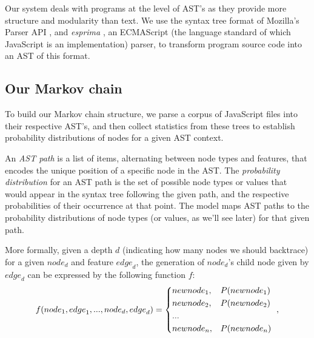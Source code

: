 \documentclass{article}
\begin{document}





Our system deals with programs at the level of AST's as they provide more structure and modularity than text.
We use the syntax tree format of Mozilla's Parser API \cite{parser api}, and \emph{esprima} \cite{esprima}, an ECMAScript
(the language standard of which JavaScript is an implementation)
parser, to transform program source code into an AST of this format.

\subsection{Our Markov chain}

To build our Markov chain structure, we parse a corpus of JavaScript files into their
respective AST's, and then collect statistics from these trees to establish probability distributions of nodes for a given AST context. 

An \emph{AST path} is a list of items, alternating between node types and features, that encodes the unique position of a 
specific node in the AST. The \emph{probability distribution} for an AST path is the set of possible node types or values that would appear in the
syntax tree following the given path, and the respective probabilities of their
occurrence at that point. The model maps AST paths to the probability distributions of node types (or values, as we'll see later) for that given
path. 

More formally, given a depth $d$ (indicating how many nodes we should backtrace) for a given
${node}_d$ and feature ${edge}_d$, the generation of ${node}_d$'s child node given by
 ${edge}_d$ can be expressed by the following function $f$: \begin{align*}
f({node}_1, {edge}_1, ..., {node}_{d}, {edge}_{d}) = \begin{dcases*}
		{newnode_1},	&	$P({newnode_1})$ \\
		{newnode_2},	&	$P({newnode_2})$ \\
		...\\
		{newnode_n},    &   $P({newnode_n})$ \\
	\end{dcases*},
\end{align*}
\end{document}

